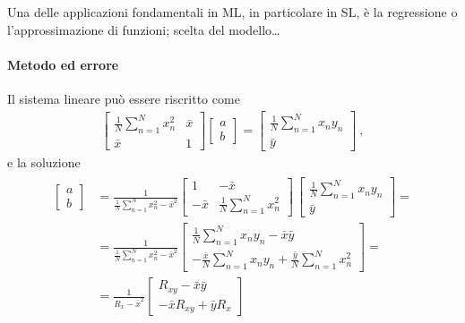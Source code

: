 \documentclass[letterpaper,10pt,italian]{jupyterBook}
\begin{document}
\sphinxAtStartPar
{} Una delle applicazioni fondamentali in ML, in particolare in SL, è la regressione o l’approssimazione di funzioni; scelta del modello…


\paragraph{Metodo ed errore}
\label{\detokenize{ch/statistics/hp-test-correlation:metodo-ed-errore}}
\sphinxAtStartPar
Il sistema lineare può essere riscritto come
\begin{equation*}
\begin{split}\begin{bmatrix} \frac{1}{N} \sum_{n=1}^N x^2_n & \bar{x}  \\ \bar{x} & 1 \end{bmatrix} \begin{bmatrix} a \\ b \end{bmatrix} = \begin{bmatrix} \frac{1}{N} \sum_{n=1}^{N} x_n y_n \\ \bar{y} \end{bmatrix} \ ,\end{split}
\end{equation*}
\sphinxAtStartPar
e la soluzione
\begin{equation*}
\begin{split}\begin{aligned}
 \begin{bmatrix} a \\ b \end{bmatrix} & = \frac{1}{\frac{1}{N} \sum_{n=1}^N x^2_n - \bar{x}^2} \begin{bmatrix} 1 & -\bar{x}  \\ -\bar{x} & \frac{1}{N} \sum_{n=1}^N x^2_n \end{bmatrix} \, \begin{bmatrix} \frac{1}{N} \sum_{n=1}^{N} x_n y_n \\ \bar{y} \end{bmatrix} = \\
 & = \frac{1}{\frac{1}{N} \sum_{n=1}^N x^2_n - \bar{x}^2} \begin{bmatrix} \frac{1}{N} \sum_{n=1}^N x_n y_n - \bar{x}\bar{y} \\ -\frac{\bar{x}}{N} \sum_{n=1}^N x_n y_n + \frac{\bar{y}}{N} \sum_{n=1}^N x_n^2 \end{bmatrix} = \\
 & = \frac{1}{R_x - \bar{x}^2} \begin{bmatrix} R_{xy} - \bar{x} \bar{y} \\ -\bar{x} R_{xy} + \bar{y} R_x \end{bmatrix}
\end{aligned}\end{split}
\end{equation*}
\end{document}
